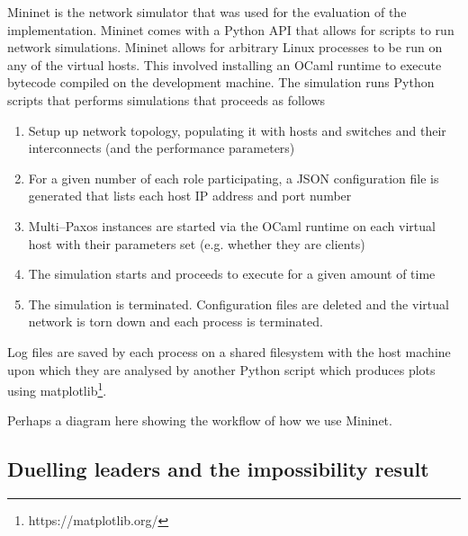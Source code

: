 Mininet is the network simulator that was used for the evaluation of the implementation. Mininet comes with a Python API that allows for scripts to run network simulations. Mininet allows for arbitrary Linux processes to be run on any of the virtual hosts. This involved installing an OCaml runtime to execute bytecode compiled on the development machine. The simulation runs Python scripts that performs simulations that proceeds as follows

\begin{enumerate}
  \item Setup up network topology, populating it with hosts and switches and their interconnects (and the performance parameters)
  \item For a given number of each role participating, a JSON configuration file is generated that lists each host IP address and port number
  \item Multi--Paxos instances are started via the OCaml runtime on each virtual host with their parameters set (e.g. whether they are clients)
  \item The simulation starts and proceeds to execute for a given amount of time
  \item The simulation is terminated. Configuration files are deleted and the virtual network is torn down and each process is terminated.
\end{enumerate}

Log files are saved by each process on a shared filesystem with the host machine upon which they are analysed by another Python script which produces plots using matplotlib\footnote{https://matplotlib.org/}.

{\color{blue}Perhaps a diagram here showing the workflow of how we use Mininet.}

\subsection{Duelling leaders and the impossibility result}

